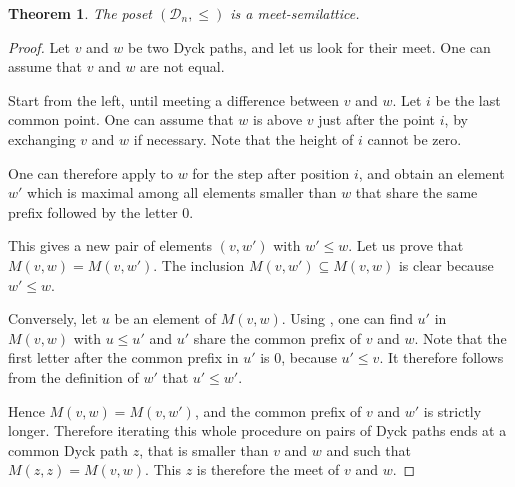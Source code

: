 \documentclass[10pt]{article}
\newtheorem{theorem}{Theorem}[section]
\theoremstyle{definition}
\newcommand{\Dyck}{\mathscr{D}}
\newcommand{\sm}{\leq}
\begin{document}
\begin{theorem}
  The poset $(\Dyck_n, \sm)$ is a meet-semilattice.
\end{theorem}
\begin{proof}
  Let $v$ and $w$ be two Dyck paths, and let us look for their
  meet. One can assume that $v$ and $w$ are not equal.

  Start from the left, until meeting a difference between $v$ and
  $w$. Let $i$ be the last common point. One can assume that $w$ is
  above $v$ just after the point $i$, by exchanging $v$ and $w$ if
  necessary. Note that the height of $i$ cannot be zero.

  One can therefore apply  to $w$ for the step after
  position $i$, and obtain an element $w'$ which is maximal among all
  elements smaller than $w$ that share the same prefix followed by
  the letter $0$.

  This gives a new pair of elements $(v,w')$ with $w' \leq w$. Let us
  prove that $M(v,w) = M(v,w')$. The inclusion $M(v,w') \subseteq
  M(v,w)$ is clear because $w' \leq w$.

  Conversely, let $u$ be an element of $M(v,w)$. Using
  , one can find $u'$ in $M(v,w)$ with $u \leq
  u'$ and $u'$ share the common prefix of $v$ and $w$. Note that the
  first letter after the common prefix in $u'$ is $0$, because $u'
  \leq v$. It therefore follows from the definition of $w'$ that $u'
  \leq w'$.

  Hence $M(v,w) = M(v,w')$, and the common prefix of $v$ and $w'$ is
  strictly longer. Therefore iterating this whole procedure on pairs
  of Dyck paths ends at a common Dyck path $z$, that is smaller than
  $v$ and $w$ and such that $M(z,z) = M(v,w)$. This $z$ is therefore
  the meet of $v$ and $w$.
\end{proof}
\end{document}
